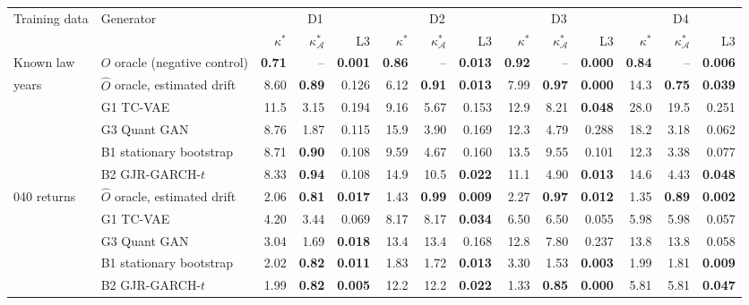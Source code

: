 \begin{tabular}{llrrrrrrrrrrrr}
\toprule
Training data & Generator & \multicolumn{3}{c}{D1} & \multicolumn{3}{c}{D2} & \multicolumn{3}{c}{D3} & \multicolumn{3}{c}{D4} \\
\cmidrule(lr){3-5}\cmidrule(lr){6-8}\cmidrule(lr){9-11}\cmidrule(lr){12-14}
& & $\kappa^\ast$ & $\kappa^\ast_{\mathcal{A}}$ & L3 & $\kappa^\ast$ & $\kappa^\ast_{\mathcal{A}}$ & L3 & $\kappa^\ast$ & $\kappa^\ast_{\mathcal{A}}$ & L3 & $\kappa^\ast$ & $\kappa^\ast_{\mathcal{A}}$ & L3 \\
\midrule
Known law & $O$ oracle (negative control) & \textbf{0.71} & -- & \textbf{0.001} & \textbf{0.86} & -- & \textbf{0.013} & \textbf{0.92} & -- & \textbf{0.000} & \textbf{0.84} & -- & \textbf{0.006} \\
\addlinespace
10 years & $\hat{O}$ oracle, estimated drift & 8.60 & \textbf{0.89} & 0.126 & 6.12 & \textbf{0.91} & \textbf{0.013} & 7.99 & \textbf{0.97} & \textbf{0.000} & 14.3 & \textbf{0.75} & \textbf{0.039} \\
 & G1 TC-VAE & 11.5 & 3.15 & 0.194 & 9.16 & 5.67 & 0.153 & 12.9 & 8.21 & \textbf{0.048} & 28.0 & 19.5 & 0.251 \\
 & G3 Quant GAN & 8.76 & 1.87 & 0.115 & 15.9 & 3.90 & 0.169 & 12.3 & 4.79 & 0.288 & 18.2 & 3.18 & 0.062 \\
 & B1 stationary bootstrap & 8.71 & \textbf{0.90} & 0.108 & 9.59 & 4.67 & 0.160 & 13.5 & 9.55 & 0.101 & 12.3 & 3.38 & 0.077 \\
 & B2 GJR-GARCH-$t$ & 8.33 & \textbf{0.94} & 0.108 & 14.9 & 10.5 & \textbf{0.022} & 11.1 & 4.90 & \textbf{0.013} & 14.6 & 4.43 & \textbf{0.048} \\
\addlinespace
151{,}040 returns & $\hat{O}$ oracle, estimated drift & 2.06 & \textbf{0.81} & \textbf{0.017} & 1.43 & \textbf{0.99} & \textbf{0.009} & 2.27 & \textbf{0.97} & \textbf{0.012} & 1.35 & \textbf{0.89} & \textbf{0.002} \\
 & G1 TC-VAE & 4.20 & 3.44 & 0.069 & 8.17 & 8.17 & \textbf{0.034} & 6.50 & 6.50 & 0.055 & 5.98 & 5.98 & 0.057 \\
 & G3 Quant GAN & 3.04 & 1.69 & \textbf{0.018} & 13.4 & 13.4 & 0.168 & 12.8 & 7.80 & 0.237 & 13.8 & 13.8 & 0.058 \\
 & B1 stationary bootstrap & 2.02 & \textbf{0.82} & \textbf{0.011} & 1.83 & 1.72 & \textbf{0.013} & 3.30 & 1.53 & \textbf{0.003} & 1.99 & 1.81 & \textbf{0.009} \\
 & B2 GJR-GARCH-$t$ & 1.99 & \textbf{0.82} & \textbf{0.005} & 12.2 & 12.2 & \textbf{0.022} & 1.33 & \textbf{0.85} & \textbf{0.000} & 5.81 & 5.81 & \textbf{0.047} \\
\bottomrule
\end{tabular}
